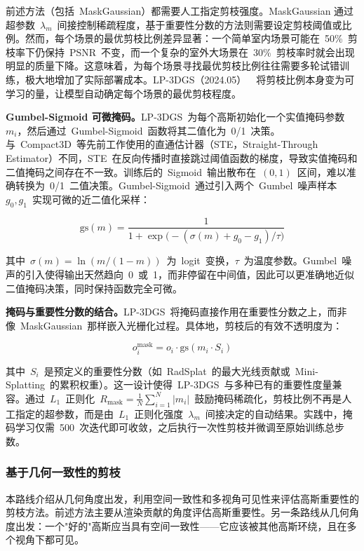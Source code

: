 前述方法（包括~MaskGaussian）都需要人工指定剪枝强度。MaskGaussian 通过超参数~$\lambda_m$~间接控制稀疏程度，基于重要性分数的方法则需要设定剪枝阈值或比例。然而，每个场景的最优剪枝比例差异显著：一个简单室内场景可能在~50\%~剪枝率下仍保持~PSNR~不变，而一个复杂的室外大场景在~30\%~剪枝率时就会出现明显的质量下降。这意味着，为每个场景寻找最优剪枝比例往往需要多轮试错训练，极大地增加了实际部署成本。LP-3DGS（2024.05）~\cite{2405_18784}~将剪枝比例本身变为可学习的量，让模型自动确定每个场景的最优剪枝程度。

\textbf{Gumbel-Sigmoid 可微掩码。}LP-3DGS~为每个高斯初始化一个实值掩码参数~$m_i$，然后通过~Gumbel-Sigmoid~函数将其二值化为~0/1~决策。与~Compact3D~等先前工作使用的直通估计器（STE，Straight-Through Estimator）不同，STE~在反向传播时直接跳过阈值函数的梯度，导致实值掩码和二值掩码之间存在不一致。训练后的~Sigmoid~输出散布在~$(0,1)$~区间，难以准确转换为~0/1~二值决策。Gumbel-Sigmoid~通过引入两个~Gumbel~噪声样本~$g_0, g_1$~实现可微的近二值化采样：

\begin{equation}
\text{gs}(m) = \frac{1}{1 + \exp\bigl(-(\sigma(m) + g_0 - g_1) / \tau\bigr)}
\end{equation}

其中~$\sigma(m) = \ln(m / (1-m))$~为~logit~变换，$\tau$~为温度参数。Gumbel~噪声的引入使得输出天然趋向~0~或~1，而非停留在中间值，因此可以更准确地近似二值掩码决策，同时保持函数完全可微。

\textbf{掩码与重要性分数的结合。}LP-3DGS~将掩码直接作用在重要性分数之上，而非像~MaskGaussian~那样嵌入光栅化过程。具体地，剪枝后的有效不透明度为：

\begin{equation}
o_i^{\text{mask}} = o_i \cdot \text{gs}(m_i \cdot S_i)
\end{equation}

其中~$S_i$~是预定义的重要性分数（如~RadSplat~的最大光线贡献或~Mini-Splatting~的累积权重）。这一设计使得~LP-3DGS~与多种已有的重要性度量兼容。通过~$L_1$~正则化~$R_{\text{mask}} = \frac{1}{N}\sum_{i=1}^{N}|m_i|$~鼓励掩码稀疏化，剪枝比例不再是人工指定的超参数，而是由~$L_1$~正则化强度~$\lambda_m$~间接决定的自动结果。实践中，掩码学习仅需~500~次迭代即可收敛，之后执行一次性剪枝并微调至原始训练总步数。

\subsubsection{基于几何一致性的剪枝}

本路线介绍从几何角度出发，利用空间一致性和多视角可见性来评估高斯重要性的剪枝方法。前述方法主要从渲染贡献的角度评估高斯重要性。另一条路线从几何角度出发：一个"好的"高斯应当具有空间一致性——它应该被其他高斯环绕，且在多个视角下都可见。

